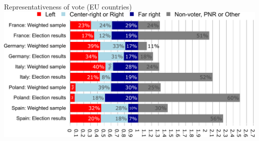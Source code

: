 \documentclass[aspectratio=169,xcolor=dvipsnames, 11pt,mathserif]{beamer}
\begin{document}
\begin{frame}{Representativeness of vote (EU countries)  \hyperlink{data}{}}
\includegraphics[height=.95\textheight]{../figures/country_comparison/vote_EU_pnr_out.pdf}
\end{frame}

\end{document}
